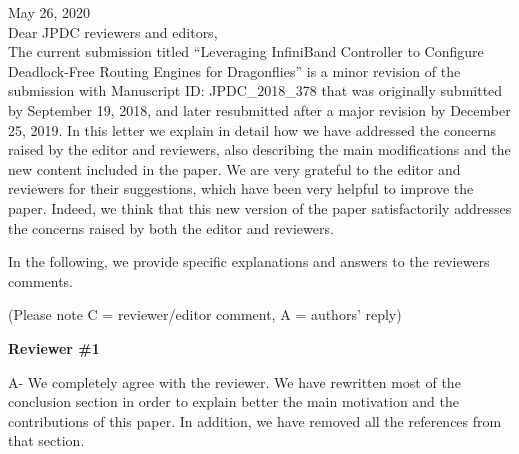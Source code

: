 \documentclass[a4paper,10pt]{letter}
\begin{document}

\clearpage
\thispagestyle{empty}

\begin{letter}
\address{German~Maglione-Mathey\\ Jesus~Escudero-Sahuquillo\\ Pedro~Javier~Garcia\\Francisco~J.~Quiles\\Eitan Zahavi\\}

May 26, 2020\\

Dear JPDC reviewers and editors, \\

The current submission titled ``Leveraging InfiniBand Controller to Configure Deadlock-Free Routing Engines
for Dragonflies'' is a minor revision
of the submission with Manuscript ID: JPDC\_2018\_378 that was originally submitted by September 19, 2018, and later resubmitted after a major revision by December 25, 2019.
In this letter we explain in detail how we have addressed the concerns raised by the editor and reviewers,
also describing the main modifications and the new content included in the paper.
We are very grateful to the editor and reviewers for their suggestions, which have been very helpful to improve the paper.
Indeed, we think that this new version of the paper satisfactorily addresses the concerns raised by both the editor and  reviewers.

In the following, we provide specific explanations and answers to the reviewers comments.

(Please note C = reviewer/editor comment, A = authors' reply)

{\bf Reviewer \#1}


A- We completely agree with the reviewer. We have rewritten most of the conclusion section in order to explain better the main motivation and the contributions of this paper. In addition, we have removed all the references from that section.



\end{letter}
\end{document}

